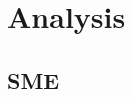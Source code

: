 \documentclass[a4paper]{report}
\newcommand{\cspm}{CSP$_M$ }
\begin{document}
%
%
%
%
%
%
%
%
%
%
%
%





\chapter{Analysis}
\section{SME}
\end{document}
